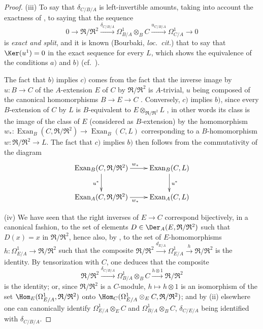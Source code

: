 \begin{proof}
\medskip
(iii) To say that $\delta_{C/B/A}$ is left-invertible amounts, taking into account the exactness of , to saying that the sequence
\begin{equation}
\tag{20.5.12.5}
  \label{0.20.5.12.5}
  0\to\mathfrak{R}/\mathfrak{R}^2\xrightarrow{\delta_{C/B/A}}\Omega^1_{B/A}\otimes_B C\xrightarrow{u_{C/B/A}}\Omega^1_{C/A}\to 0
\end{equation}
is \emph{exact and split}, and it is known (Bourbaki, \emph{loc.\ cit.}) that to say that $\Ker(u^1)=0$ in the exact sequence  for every $L$, which shows the equivalence of the conditions $a)$ and $b)$ (cf.\ ).

The fact that $b)$ implies $c)$ comes from the fact that the inverse image by $u:B\to C$ of the $A$-extension $E$ of $C$ by $\mathfrak{R}/\mathfrak{R}^2$ is $A$-trivial, $u$ being composed of the canonical homomorphisms $B\to E\to C$ .
Conversely, $c)$ implies $b)$, since every $B$-extension of $C$ by $L$ is $B$-equivalent to $E\otimes_{\mathfrak{R}/\mathfrak{R}^2}L$ , in other words its class is the image of the class of $E$ (considered as $B$-extension) by the homomorphism
$w_*:\operatorname{Exan}_B(C,\mathfrak{R}/\mathfrak{R}^2)\to\operatorname{Exan}_B(C,L)$ corresponding to a $B$-homomorphism $w:\mathfrak{R}/\mathfrak{R}^2\to L$.
The fact that $c)$ implies $b)$ then follows from the commutativity of the diagram 
\[
\xymatrix{
  \operatorname{Exan}_B(C,\mathfrak{R}/\mathfrak{R}^2) \ar[r]^{w_*} \ar[d]_{u^*} & \operatorname{Exan}_B(C,L) \ar[d]^{u^*} \\
  \operatorname{Exan}_A(C,\mathfrak{R}/\mathfrak{R}^2) \ar[r]_{w_*} & \operatorname{Exan}_A(C,L)
}
\]

\medskip
(iv) We have seen  that the right inverses of $E\to C$ correspond bijectively, in a canonical fashion, to the set of elements $D\in\Der_A(E,\mathfrak{R}/\mathfrak{R}^2)$ such that $D(x)=x$ in $\mathfrak{R}/\mathfrak{R}^2$, hence also, by , to the set of $E$-homomorphisms $h:\Omega^1_{E/A}\to\mathfrak{R}/\mathfrak{R}^2$ such that the composite $\mathfrak{R}/\mathfrak{R}^2\xrightarrow{d_{E/A}}\Omega^1_{E/A}\xrightarrow{h}\mathfrak{R}/\mathfrak{R}^2$ is the identity.
By tensorization with $C$, one deduces that the composite
\[
  \mathfrak{R}/\mathfrak{R}^2\xrightarrow{\delta_{C/B/A}}\Omega^1_{B/A}\otimes_B C\xrightarrow{h\otimes 1}\mathfrak{R}/\mathfrak{R}^2
\]
is the identity; or, since $\mathfrak{R}/\mathfrak{R}^2$ is a $C$-module, $h\mapsto h\otimes 1$ is an isomorphism of the set $\Hom_E(\Omega^1_{E/A},\mathfrak{R}/\mathfrak{R}^2)$ onto $\Hom_C(\Omega^1_{E/A}\otimes_E C,\mathfrak{R}/\mathfrak{R}^2)$; and by (ii) elsewhere one can canonically identify $\Omega^1_{E/A}\otimes_E C$ and $\Omega^1_{B/A}\otimes_B C$, $\delta_{C/E/A}$ being identified with $\delta_{C/B/A}$.
\end{proof}

